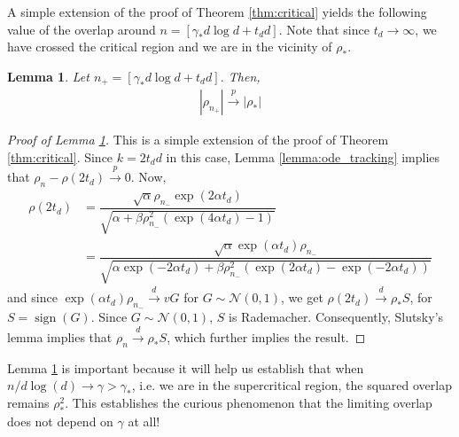 \documentclass[12pt]{article}
\newtheorem{lemma}[theorem]{Lemma}      %
\newtheorem{remark}[theorem]{Remark}    %
\def\gN{{\mathcal{N}}}
\DeclareMathOperator{\sign}{sign}
\begin{document}

\medskip

A simple extension of the proof of Theorem \ref{thm:critical} yields the following value of the overlap around $n=[\gamma_*d\log d + t_d d]$. Note that since $t_d\to\infty$, we have crossed the critical region and we are in the vicinity of $\rho_*$.

\medskip

\begin{lemma}\label{lemma:critical_upper_boundary}
    Let $n_+=[\gamma_*d\log d+t_d d]$. Then,
    \begin{align*}
        |\rho_{n_+}|\stackrel{p}{\to}|\rho_*|
    \end{align*}
\end{lemma}

\medskip

\begin{proof}[Proof of Lemma \ref{lemma:critical_upper_boundary}]
    This is a simple extension of the proof of Theorem \ref{thm:critical}. Since $k=2t_d d$ in this case, Lemma \ref{lemma:ode_tracking} implies that $\rho_n-\rho(2t_d)\stackrel{p}{\to}0$. Now,
    \begin{align*}
        \rho(2t_d) &= \dfrac{\sqrt{\alpha}\rho_{n_-}\exp(2\alpha t_d)}{\sqrt{\alpha + \beta \rho^2_{n_-}(\exp(4\alpha t_d)-1)}}\\
        &= \dfrac{\sqrt{\alpha}\exp(\alpha t_d)\rho_{n_-}}{\sqrt{\alpha \exp(-2\alpha t_d)+\beta\rho^2_{n_-}(\exp(2\alpha t_d)-\exp(-2\alpha t_d))}}
    \end{align*}and since $\exp(\alpha t_d)\rho_{n_-}\stackrel{d}{\to}vG$ for $G\sim \gN(0,1)$, we get $\rho(2t_d)\stackrel{d}{\to}\rho_*S$, for $S=\sign(G)$. Since $G\sim\gN(0,1)$, $S$ is Rademacher. Consequently, Slutsky's lemma implies that $\rho_n\stackrel{d}{\to}\rho_*S$, which further implies the result.
\end{proof}

\medskip

Lemma \ref{lemma:critical_upper_boundary} is important because it will help us establish that when $n/d\log(d) \to \gamma > \gamma_*$, i.e. we are in the supercritical region, the squared overlap remains $\rho_*^2$. This establishes the curious phenomenon that the limiting overlap does not depend on $\gamma$ at all!
\end{document}
